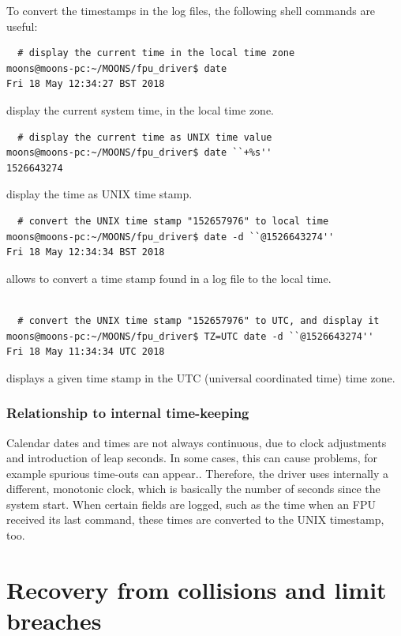 \documentclass[11pt,a4paper]{report}
\begin{document}
To convert the timestamps in the log files, the following
shell commands are useful:

\begin{verbatim}
  # display the current time in the local time zone
moons@moons-pc:~/MOONS/fpu_driver$ date
Fri 18 May 12:34:27 BST 2018
\end{verbatim}
display the current system time, in the local time zone.

\begin{verbatim}
  # display the current time as UNIX time value
moons@moons-pc:~/MOONS/fpu_driver$ date ``+%s''
1526643274
\end{verbatim}
display the time as UNIX time stamp.

\begin{verbatim}
  # convert the UNIX time stamp "152657976" to local time
moons@moons-pc:~/MOONS/fpu_driver$ date -d ``@1526643274''
Fri 18 May 12:34:34 BST 2018
\end{verbatim}
allows to convert a time stamp found in a log file to
the local time.

\begin{verbatim}
  
  # convert the UNIX time stamp "152657976" to UTC, and display it
moons@moons-pc:~/MOONS/fpu_driver$ TZ=UTC date -d ``@1526643274''
Fri 18 May 11:34:34 UTC 2018
\end{verbatim}
displays a given time stamp in the UTC (universal coordinated time)
time zone.

\subsubsection{Relationship to internal time-keeping}
Calendar dates and times are not always continuous, due to clock
adjustments and introduction of leap seconds. In some cases, this can
cause problems, for example spurious time-outs can appear.. Therefore,
the driver uses internally a different, monotonic clock, which is
basically the number of seconds since the system start. When certain
fields are logged, such as the time when an FPU received its last
command, these times are converted to the UNIX timestamp, too.


\section{Recovery from collisions and limit breaches}
\label{sec:recovery}
\end{document}
